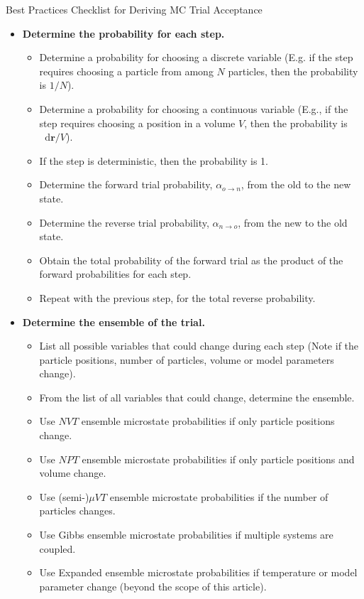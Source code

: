 \documentclass[
  9pt,
  bestpractices,
]{livecoms}
\newcommand*\diff{\mathop{}\!\mathrm{d}}
\begin{document}
\begin{Checklists*}[p!]
\begin{checklist}{Best Practices Checklist for Deriving MC Trial Acceptance}
\begin{itemize}
\item
  \textbf{Determine the probability for each step.}
  \begin{itemize}
    \item Determine a probability for choosing a discrete variable (E.g. if the step requires choosing a particle from among $N$ particles, then the probability is $1/N$).
    \item Determine a probability for choosing a continuous variable (E.g., if the step requires choosing a position in a volume $V$, then the probability is $\diff\mathbf{r}/V$).
    \item If the step is deterministic, then the probability is 1.
    \item Determine the forward trial probability, $\alpha_{o \rightarrow n}$, from the old to the new state.
    \item Determine the reverse trial probability, $\alpha_{n \rightarrow o}$, from the new to the old state.
    \item Obtain the total probability of the forward trial as the product of the forward probabilities for each step.
    \item Repeat with the previous step, for the total reverse probability.
  \end{itemize}

\item
  \textbf{Determine the ensemble of the trial.}
  \begin{itemize}
    \item List all possible variables that could change during each step (Note if the particle positions, number of particles, volume or model parameters change).
    \item From the list of all variables that could change, determine the ensemble.
    \item Use $NVT$ ensemble microstate probabilities if only particle positions change.
    \item Use $NPT$ ensemble microstate probabilities if only particle positions and volume change.
    \item Use (semi-)$\mu VT$ ensemble microstate probabilities if the number of particles changes.
    \item Use Gibbs ensemble microstate probabilities if multiple systems are coupled.
    \item Use Expanded ensemble microstate probabilities if temperature or model parameter change (beyond the scope of this article).
  \end{itemize}


\end{itemize}
\end{checklist}
\end{Checklists*}
\end{document}
